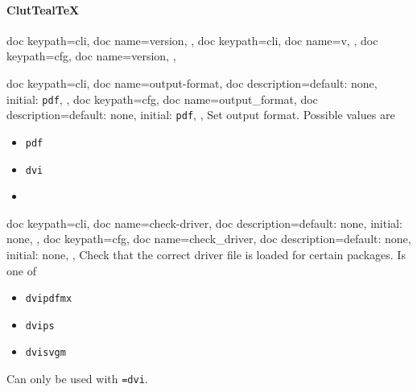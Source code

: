 \documentclass[a4paper, 11pt]{scrartcl}
\let\TeXold\TeX
\newcommand\CluttealTeX{ClutTeal\TeX\xspace}
\renewcommand\TeX{\TeXold\xspace}
\begin{document}
\paragraph{\CluttealTeX}
\begin{docKeys}[
	]{
		{
			doc keypath=cli,
			doc name=version,
		},
		{
			doc keypath=cli,
			doc name=v,
		},
		{
			doc keypath=cfg,
			doc name=version,
		},
	}
\end{docKeys}
\begin{docKeys}[
		doc parameter={=\meta{output\_format}},
	]{
		{
			doc keypath=cli,
			doc name=output-format,
			doc description={default: none, initial: \texttt{pdf}},
		},
		{
			doc keypath=cfg,
			doc name=output_format,
			doc description={default: none, initial: \texttt{pdf}},
		},
	}
	Set output format.
	Possible values are
	\begin{multicols}{3}
		\begin{itemize}
			\item \texttt{pdf}
			\item \texttt{dvi}
			\item[]
		\end{itemize}
	\end{multicols}
\end{docKeys}
\begin{docKeys}[
		doc parameter={=\meta{check\_driver}},
	]{
		{
			doc keypath=cli,
			doc name=check-driver,
			doc description={default: none, initial: none},
		},
		{
			doc keypath=cfg,
			doc name=check_driver,
			doc description={default: none, initial: none},
		},
	}
	Check that the correct driver file is loaded for certain packages.
	Is one of
	\begin{multicols}{3}
		\begin{itemize}
			\item \texttt{dvipdfmx}
			\item \texttt{dvips}
			\item \texttt{dvisvgm}
		\end{itemize}
	\end{multicols}
	Can only be used with \texttt{=dvi}.
\end{docKeys}
\end{document}
